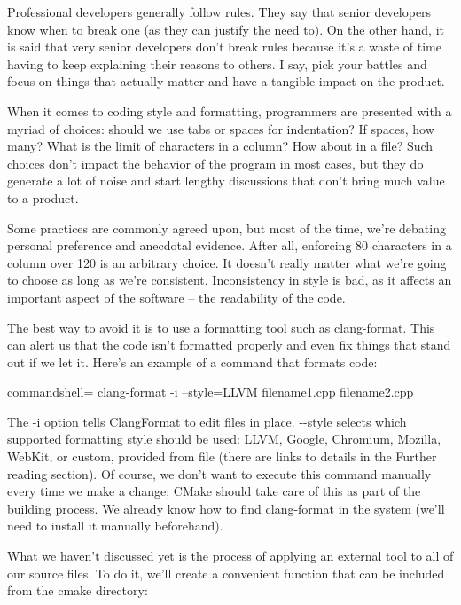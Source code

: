 Professional developers generally follow rules. They say that senior developers know when to break one (as they can justify the need to). On the other hand, it is said that very senior developers don't break rules because it's a waste of time having to keep explaining their reasons to others. I say, pick your battles and focus on things that actually matter and have a tangible impact on the product.

When it comes to coding style and formatting, programmers are presented with a myriad of choices: should we use tabs or spaces for indentation? If spaces, how many? What is the limit of characters in a column? How about in a file? Such choices don't impact the behavior of the program in most cases, but they do generate a lot of noise and start lengthy discussions that don't bring much value to a product.

Some practices are commonly agreed upon, but most of the time, we're debating personal preference and anecdotal evidence. After all, enforcing 80 characters in a column over 120 is an arbitrary choice. It doesn't really matter what we're going to choose as long as we're consistent. Inconsistency in style is bad, as it affects an important aspect of the software – the readability of the code.

The best way to avoid it is to use a formatting tool such as clang-format. This can alert us that the code isn't formatted properly and even fix things that stand out if we let it.
Here's an example of a command that formats code:

\begin{tcblisting}{commandshell={}}
clang-format -i --style=LLVM filename1.cpp filename2.cpp
\end{tcblisting}

The -i option tells ClangFormat to edit files in place. -{}-style selects which supported formatting style should be used: LLVM, Google, Chromium, Mozilla, WebKit, or custom, provided from file (there are links to details in the Further reading section).
Of course, we don't want to execute this command manually every time we make a change; CMake should take care of this as part of the building process. We already know how to find clang-format in the system (we'll need to install it manually beforehand).

What we haven't discussed yet is the process of applying an external tool to all of our source files. To do it, we'll create a convenient function that can be included from the cmake directory:

